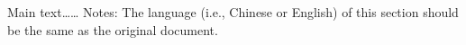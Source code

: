 
\begin{resolution}

Main text…… Notes: The language (i.e., Chinese or English) of this section should be the same as the original document.








\end{resolution}
